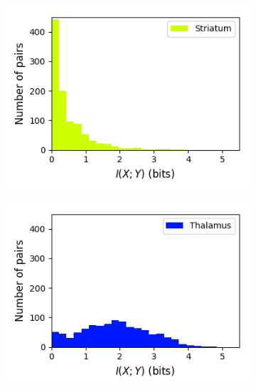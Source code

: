 \documentclass[a4paper,12pt]{article}
\theoremstyle{definition}
\begin{document}
\begin{figure}[p]
\begin{subfigure}{0.5\textwidth}
    \includegraphics[width=\textwidth]{figures/all_striatum_14_1p0_information_histogram.png}
  \end{subfigure}
  \begin{subfigure}{0.5\textwidth}
    \centering
    \includegraphics[width=\textwidth]{figures/all_thalamus_15_1p0_information_histogram.png}
  \end{subfigure}
  \begin{subfigure}{0.5\textwidth}
    \centering

\end{subfigure}
\end{figure}
\end{document}
